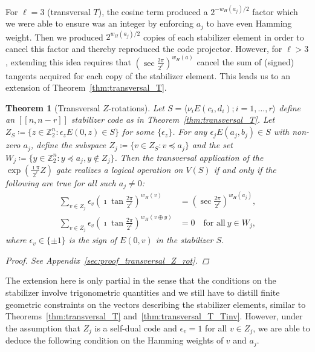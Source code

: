 \documentclass[twoside,romanappendices]{IEEEtran}
\newtheorem{theorem}{Theorem}
\newcommand{\llbr}{[\![}
\newcommand{\rrbr}{]\!]}
\begin{document}
For $\ell = 3$ (transversal $T$), the cosine term produced a $2^{-w_H(a_j)/2}$ factor which we were able to ensure was an integer by enforcing $a_j$ to have even Hamming weight.
Then we produced $2^{w_H(a_j)/2}$ copies of each stabilizer element in order to cancel this factor and thereby reproduced the code projector.
However, for $\ell > 3$, extending this idea requires that $\left( \sec\frac{2\pi}{2^{\ell}} \right)^{w_H(a)}$ cancel the sum of (signed) tangents acquired for each copy of the stabilizer element.
This leads us to an extension of Theorem~\ref{thm:transversal_T}.


\begin{theorem}[Transversal $Z$-rotations]
\label{thm:transversal_Z_rot}
Let $S = \langle \nu_i E(c_i,d_i) ; i = 1,\ldots,r \rangle$ define an $\llbr n,n-r \rrbr$ stabilizer code as in Theorem~\ref{thm:transversal_T}.
Let $Z_S \coloneqq \{ z \in \mathbb{Z}_2^n \colon \epsilon_z E(0,z) \in S \}$ for some $\{ \epsilon_z \}$. 
For any $\epsilon_j E(a_j,b_j) \in S$ with non-zero $a_j$, define the subspace $Z_j \coloneqq \{ v \in Z_S \colon v \preceq a_j \}$ and the set $W_j \coloneqq \{ y \in \mathbb{Z}_2^n \colon y \preceq a_j, y \notin Z_j \}$.
Then the transversal application of the $\exp\left( \frac{\imath\pi}{2^{\ell}} Z \right)$ gate realizes a logical operation on $V(S)$ if and only if the following are true for all such $a_j \neq 0$:
\begin{align}
\sum_{v \in Z_j} \epsilon_v \left( \imath \tan\frac{2\pi}{2^{\ell}} \right)^{w_H(v)} & = \left( \sec\frac{2\pi}{2^{\ell}} \right)^{w_H(a_j)}, \\
%
\sum_{v \in Z_j} \epsilon_v \left( \imath \tan\frac{2\pi}{2^{\ell}} \right)^{w_H(v \oplus y)} & = 0 \quad \text{for\ all}\ y \in W_j,
\end{align}      
where $\epsilon_v \in \{ \pm 1 \}$ is the sign of $E(0,v)$ in the stabilizer $S$.
\begin{proof}
See Appendix~\ref{sec:proof_transversal_Z_rot}.
\end{proof}
\end{theorem}

The extension here is only partial in the sense that the conditions on the stabilizer involve trigonometric quantities and we still have to distill finite geometric constraints on the vectors describing the stabilizer elements, similar to Theorems~\ref{thm:transversal_T} and~\ref{thm:transversal_T_Tinv}.
However, under the assumption that $Z_j$ is a self-dual code and $\epsilon_v = 1$ for all $v \in Z_j$, we are able to deduce the following condition on the Hamming weights of $v$ and $a_j$.
\end{document}
